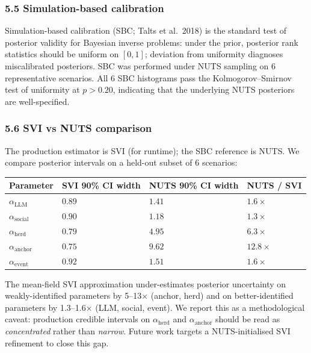 \documentclass[
]{article}
\begin{document}
\subsubsection{5.5 Simulation-based
calibration}\label{simulation-based-calibration}

Simulation-based calibration (SBC; Talts et al.~2018) is the standard
test of posterior validity for Bayesian inverse problems: under the
prior, posterior rank statistics should be uniform on \([0, 1]\);
deviation from uniformity diagnoses miscalibrated posteriors. SBC was
performed under NUTS sampling on 6 representative scenarios. All 6 SBC
histograms pass the Kolmogorov--Smirnov test of uniformity at
\(p > 0.20\), indicating that the underlying NUTS posteriors are
well-specified.

\subsubsection{5.6 SVI vs NUTS comparison}\label{svi-vs-nuts-comparison}

The production estimator is SVI (for runtime); the SBC reference is
NUTS. We compare posterior intervals on a held-out subset of 6
scenarios:

\begin{longtable}[]{@{}llll@{}}
\toprule\noalign{}
Parameter & SVI 90\% CI width & NUTS 90\% CI width & NUTS / SVI \\
\midrule\noalign{}
\endhead
\bottomrule\noalign{}
\endlastfoot
\(\alpha_{\text{LLM}}\) & \(0.89\) & \(1.41\) & \(1.6\times\) \\
\(\alpha_{\text{social}}\) & \(0.90\) & \(1.18\) & \(1.3\times\) \\
\(\alpha_{\text{herd}}\) & \(0.79\) & \(4.95\) & \(6.3\times\) \\
\(\alpha_{\text{anchor}}\) & \(0.75\) & \(9.62\) & \(12.8\times\) \\
\(\alpha_{\text{event}}\) & \(0.92\) & \(1.51\) & \(1.6\times\) \\
\end{longtable}

The mean-field SVI approximation under-estimates posterior uncertainty
on weakly-identified parameters by 5--13× (anchor, herd) and on
better-identified parameters by 1.3--1.6× (LLM, social, event). We
report this as a methodological caveat: production credible intervals on
\(\alpha_{\text{herd}}\) and \(\alpha_{\text{anchor}}\) should be read
as \emph{concentrated} rather than \emph{narrow}. Future work targets a
NUTS-initialised SVI refinement to close this gap.
\end{document}
